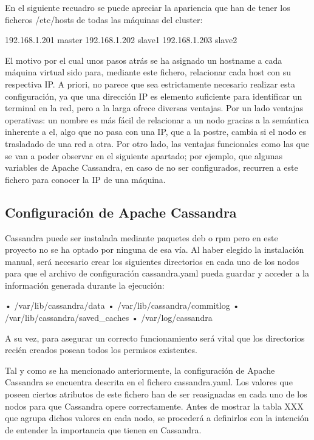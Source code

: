 En el siguiente recuadro se puede apreciar la apariencia que han de tener los ficheros /etc/hosts de todas las máquinas del cluster:

192.168.1.201 master
192.168.1.202 slave1
192.168.1.203 slave2

El motivo por el cual unos pasos atrás se ha asignado un hostname a cada máquina virtual sido para, mediante este fichero, relacionar cada host con su respectiva IP. A priori, no parece que sea estrictamente necesario realizar esta configuración, ya que una dirección IP es elemento suficiente para identificar un terminal en la red, pero a la larga ofrece diversas ventajas. Por un lado  ventajas operativas: un nombre es más fácil de relacionar a un nodo gracias a la semántica inherente a el, algo que no pasa con una IP, que a la postre, cambia si el nodo es trasladado de una red a otra. Por otro lado, las ventajas funcionales como las que se van a poder observar en el siguiente apartado; por ejemplo, que algunas variables de Apache Cassandra, en caso de no ser configurados, recurren a este fichero para conocer la IP de una máquina.  

\subsection{Configuración de Apache Cassandra}

Cassandra puede ser instalada mediante paquetes deb o rpm pero en este proyecto no se ha optado por ninguna de esa vía. Al haber elegido la instalación manual, será necesario crear los siguientes directorios en cada uno de los nodos para que el archivo de configuración cassandra.yaml pueda guardar y acceder a la información generada durante la ejecución:

•	/var/lib/cassandra/data
•	/var/lib/cassandra/commitlog
•	/var/lib/cassandra/saved_caches
•	/var/log/cassandra


A su vez, para asegurar un correcto funcionamiento será vital que los directorios recién creados posean todos los permisos existentes. 

Tal y como se ha mencionado anteriormente, la configuración de Apache Cassandra se encuentra descrita en el fichero cassandra.yaml. Los valores que poseen ciertos atributos de este fichero han de ser reasignadas en cada uno de los nodos para que Cassandra opere correctamente. Antes de mostrar la tabla XXX que agrupa dichos valores en cada nodo, se procederá a definirlos con la intención de entender la importancia que tienen en Cassandra.

